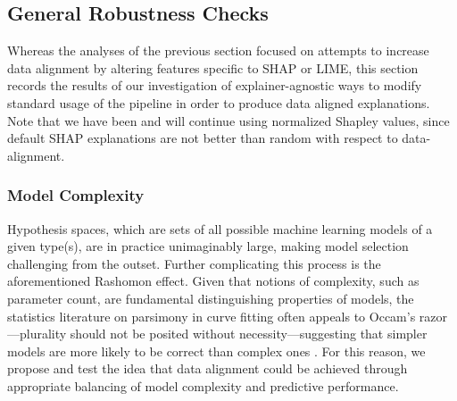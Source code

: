 \documentclass[mnsc,blindrev]{informs3}
\newcommand{\mM}{\mathcal{M}}
\newcommand{\tw}[1]{\textcolor{red}{Tong: #1}}
\begin{document}
    \subsection{General Robustness Checks}
        Whereas the analyses of the previous section focused on attempts to increase data alignment by altering features specific to SHAP or LIME, this section records the results of our investigation of explainer-agnostic ways to modify standard usage of the pipeline in order to produce data aligned explanations. Note that we have been and will continue using normalized Shapley values, since default SHAP explanations are not better than random with respect to data-alignment. %

        \subsubsection{Model Complexity}
            \label{sec:decreasing_complexity}
            Hypothesis spaces, which are sets of all possible machine learning models of a given type(s), are in practice unimaginably large, making model selection challenging from the outset. Further complicating this process is the aforementioned Rashomon effect. Given that notions of complexity, such as parameter count, are fundamental distinguishing properties of models, the statistics literature on parsimony in curve fitting often appeals to Occam's razor—plurality should not be posited without necessity—suggesting that simpler models are more likely to be correct than complex ones \citep{popper2005logic}. For this reason, we %
            propose and test the idea that data alignment could be achieved through appropriate balancing of model complexity and predictive performance. %
\end{document}
